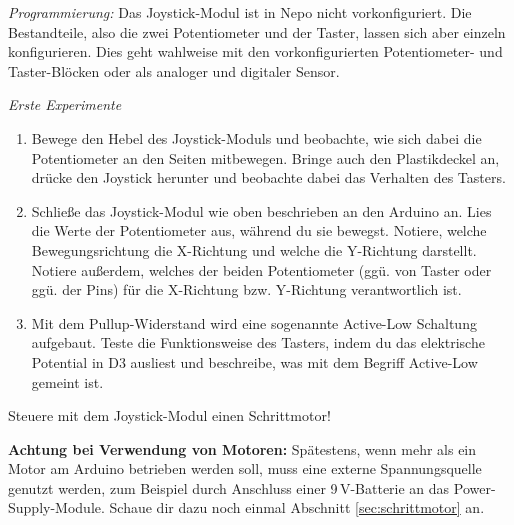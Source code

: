 \medskip
\emph{Programmierung:} Das Joystick-Modul ist in Nepo nicht vorkonfiguriert. Die Bestandteile, also die zwei Potentiometer und der Taster, lassen sich aber einzeln konfigurieren. Dies geht wahlweise mit den vorkonfigurierten Potentiometer- und Taster-Blöcken oder als analoger und digitaler Sensor.

\medskip

\begin{aufgabe} \emph{Erste Experimente}
	\begin{enumerate}[label=\alph*), itemsep=0.5ex,parsep=0ex]
		\item Bewege den Hebel des Joystick-Moduls und beobachte, wie sich dabei die Potentiometer an den Seiten mitbewegen. Bringe auch den Plastikdeckel an, drücke den Joystick herunter und beobachte dabei das Verhalten des Tasters.
		\item Schließe das Joystick-Modul wie oben beschrieben an den Arduino an. Lies die Werte der Potentiometer aus, während du sie bewegst. Notiere, welche Bewegungsrichtung die X-Richtung und welche die Y-Richtung darstellt. Notiere außerdem, welches der beiden Potentiometer (ggü. von Taster oder ggü. der Pins) für die X-Richtung bzw. Y-Richtung verantwortlich ist.
		\item Mit dem Pullup-Widerstand wird eine sogenannte Active-Low Schaltung aufgebaut. Teste die Funktionsweise des Tasters, indem du das elektrische Potential in D3 ausliest und beschreibe, was mit dem Begriff Active-Low gemeint ist.
	\end{enumerate}
\end{aufgabe}

\begin{projekt}\label{proj:joystick-motor}
	Steuere mit dem Joystick-Modul einen Schrittmotor!
\end{projekt}


\textbf{Achtung bei Verwendung von Motoren:}\marginpar{\centering\ausrufezeichen} Spätestens, wenn mehr als ein Motor am Arduino betrieben werden soll, muss eine externe Spannungsquelle genutzt werden, zum Beispiel durch Anschluss einer 9\,V-Batterie an das Power-Supply-Module. Schaue dir dazu noch einmal Abschnitt \ref{sec:schrittmotor} an.

